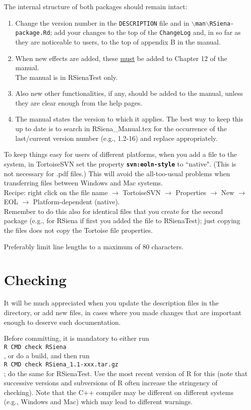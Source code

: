 \documentclass[12pt, a4paper]{article}
\renewcommand{\=}{\,=\,}
\newcommand{\+}{\,+\,}
\newcommand{\sfn}[1]{\textbf{\texttt{#1}}}
\newcommand{\bs}{\backslash}
\newcommand{\RS}{{\sf RSiena }}
\newcommand{\rst}{{\sf RSienaTest}}
\newcommand{\RST}{{\sf RSienaTest }}
\begin{document}
The internal structure of both packages should remain intact:
\begin{enumerate}
\item Change the version number in the \texttt{DESCRIPTION} file and in
      \texttt{$\bs$man$\bs$RSiena-package.Rd};
      add your changes to the top of the \texttt{ChangeLog} and,
      in so far as they are noticeable
      to users, to the top of appendix B in the manual.
\item When new effects are added, these \underline{must} be added to
      Chapter 12 of the manual.\\
      The manual is in \RST only.
\item Also new other functionalities, if any, should be added to the manual,
      unless they are clear enough from the help pages.
\item The manual states the version to which it applies. The best way to keep
      this up to date is to search in RSiena\_Manual.tex for the occurrence of the
      last/current version number (e.g., 1.2-16) and replace appropriately.
\end{enumerate}

To keep things easy for users of different platforms, when you add a file to the system,
in TortoiseSVN set the property \sfn{svn:eoln-style} to ``native".
(This is not necessary for .pdf files.)
This will avoid the all-too-usual problems when transferring files between Windows and Mac systems.\\
Recipe: right click on the file name $\rightarrow$ TortoiseSVN $\rightarrow$ Properties  $\rightarrow$
New  $\rightarrow$ EOL  $\rightarrow$ Platform-dependent (native).\\
Remember to do this also for identical files that you create for the second package (e.g., for \RS if
first you added the file to \rst); just copying the files does not copy
the Tortoise file properties.

Preferably limit line lengths to a maximum of 80 characters.

\section{Checking}


 It will be much appreciated when you update the description files in
 the  directory, or add new files, in cases where you made changes that are
 important enough to deserve such documentation.

  Before committing, it is mandatory to either run \\
  \verb|R CMD check RSiena|\\
  , or do a build, and then run \\
  \verb|R CMD check RSiena_1.1-xxx.tar.gz|\\
  ; do the same for \rst.
  Use the most recent version of R for this (note that
  successive versions and subversions of R often increase the stringency of checking).
  Note that the C++ compiler may be different on different systems (e.g., Windows and Mac)
  which may lead to different warnings.
\end{document}
